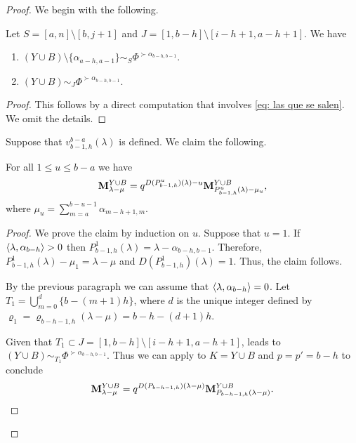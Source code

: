 \begin{proof}
We begin with the following.
\begin{claim}\label{claim: alpha a v}
        Let $S = [a,n] \setminus [b,j+1]$ and $J = [1,b-h] \setminus [i-h+1,a-h+1]$. We have
\begin{enumerate}
        \item \label{item a claim alpha a v} $(Y\cup B)\setminus \{\alpha_{a-h,a-1}\}\sim_{S} \Phi^{\succ \alpha_{b-h,b-1}}$. 
        \item \label{item b claim alpha a v} $(Y\cup B)\sim_{J}\Phi^{\succ \alpha_{b-h,b-1}}$.
\end{enumerate}
    \end{claim}
\begin{proof}
    This follows by a direct computation that involves \eqref{eq: las que se salen}.
    We omit the details.
\end{proof}

    
Suppose that $v_{b-1,h}^{b-a}(\lambda)$ is defined. 
We claim the following.
\begin{claim}\label{claim: pass tov stop in P}
    For all $1\leq u \leq b-a$ we have
    \begin{equation} \label{eq:  pass to v stop in P}
        \mathbf{M}^{Y\cup B}_{\lambda -\mu} = q^{D(P_{b-1,h}^u)(\lambda) -u}\mathbf{M}_{P_{b-1,h}^u(\lambda)-\mu_u}^{Y\cup B},
    \end{equation}
    where $\displaystyle \mu_u=\sum_{m=a}^{b-u-1}\alpha_{m-h+1,m}$. 
\end{claim}
\begin{proof}
    We prove the claim by induction on $u$.
    Suppose that $u=1$. 
    If $\langle \lambda , \alpha_{b-h} \rangle>0$ then $P_{b-1,h}^1(\lambda)= \lambda -\alpha_{b-h,b-1}$. 
    Therefore,   $P_{b-1,h}^1(\lambda) - \mu_1=\lambda -\mu $ and $D(P_{b-1,h}^{1})(\lambda)=1$.
    Thus, the claim follows. 

    By the previous paragraph we can assume that $\langle \lambda  , \alpha_{b-h} \rangle=0$. 
    Let $T_{1} = \bigcup_{m=0}^{d} \{ b-(m+1)h \} $, where $d$ is the unique integer defined by $\varrho_{1} = \varrho_{b-h-1,h}(\lambda -\mu) = b-h- (d+1)h$.

  Given that $T_{1} \subset J = [1,b-h] \setminus [i-h+1,a-h+1]$,  leads to $(Y\cup B)\sim_{T_{1}}\Phi^{\succ \alpha_{b-h,b-1}}$.
  Thus we can apply  to $K=Y\cup B$ and $p=p'=b-h$ to conclude
\begin{equation}
    \mathbf{M}_{\lambda -\mu}^{Y\cup B} = q^{D(P_{b-h-1,h})(\lambda - \mu)} \mathbf{M}_{P_{b-h-1,h}(\lambda - \mu)}^{Y\cup B}  .
\end{equation}




\end{proof}
\end{proof}
